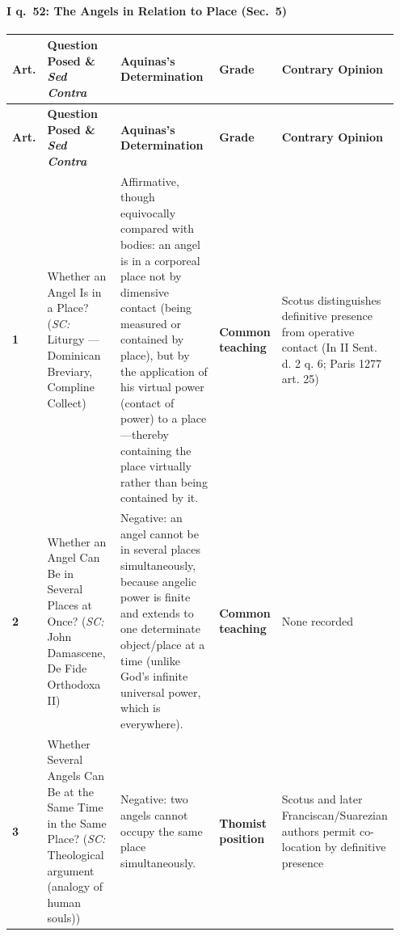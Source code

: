 \paragraph{I q.~52: The Angels in Relation to Place (Sec.~5)}
{\scriptsize
\setlength{\tabcolsep}{2.5pt}
\renewcommand{\arraystretch}{1.15}
\begin{longtable}{>{\raggedright\arraybackslash}p{0.05\linewidth}>{\raggedright\arraybackslash}p{0.23\linewidth}>{\raggedright\arraybackslash}p{0.31\linewidth}>{\raggedright\arraybackslash}p{0.12\linewidth}>{\raggedright\arraybackslash}p{0.24\linewidth}}
\toprule
\textbf{Art.} & \textbf{Question Posed \& \emph{Sed Contra}} & \textbf{Aquinas's Determination} & \textbf{Grade} & \textbf{Contrary Opinion} \\
\midrule
\endfirsthead
\toprule
\textbf{Art.} & \textbf{Question Posed \& \emph{Sed Contra}} & \textbf{Aquinas's Determination} & \textbf{Grade} & \textbf{Contrary Opinion} \\
\midrule
\endhead
\bottomrule
\endfoot
\textbf{1} & Whether an Angel Is in a Place? (\emph{SC:} Liturgy --- Dominican Breviary, Compline Collect) & Affirmative, though equivocally compared with bodies: an angel is in a corporeal place not by dimensive contact (being measured or contained by place), but by the application of his virtual power (contact of power) to a place---thereby containing the place virtually rather than being contained by it. & \textbf{Common teaching} & Scotus distinguishes definitive presence from operative contact (In II Sent. d. 2 q. 6; Paris 1277 art. 25) \\
\addlinespace[1.5pt]
\textbf{2} & Whether an Angel Can Be in Several Places at Once? (\emph{SC:} John Damascene, De Fide Orthodoxa II) & Negative: an angel cannot be in several places simultaneously, because angelic power is finite and extends to one determinate object/place at a time (unlike God's infinite universal power, which is everywhere). & \textbf{Common teaching} & None recorded \\
\addlinespace[1.5pt]
\textbf{3} & Whether Several Angels Can Be at the Same Time in the Same Place? (\emph{SC:} Theological argument (analogy of human souls)) & Negative: two angels cannot occupy the same place simultaneously. & \textbf{Thomist position} & Scotus and later Franciscan/Suarezian authors permit co-location by definitive presence \\
\end{longtable}
}

